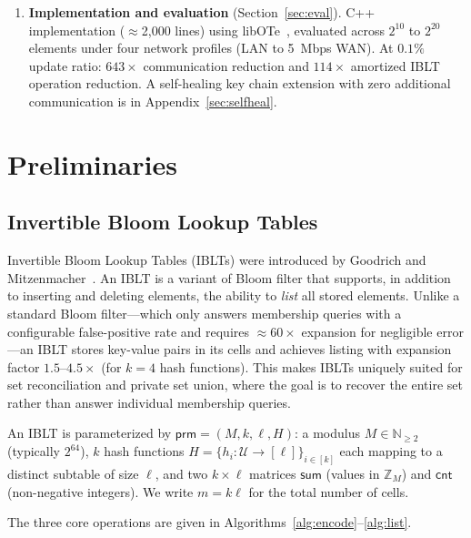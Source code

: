 \documentclass[letterpaper,twocolumn,10pt]{article}
\theoremstyle{definition}
\newcommand{\Z}{\mathbb{Z}}\newcommand{\N}{\mathbb{N}}
\newcommand{\U}{\mathcal{U}}\newcommand{\cF}{\mathcal{F}}
\newcommand{\prm}{\mathsf{prm}}\newcommand{\Enc}{\mathsf{Enc}}
\begin{document}
\begin{enumerate}
\item \textbf{Implementation and evaluation} (Section~\ref{sec:eval}). C++
implementation ($\approx$2,000 lines) using libOTe~\cite{libOTe}, evaluated
across $2^{10}$ to $2^{20}$ elements under four network profiles (LAN to
5~Mbps WAN). At $0.1\%$ update ratio: $643\times$ communication reduction and
$114\times$ amortized IBLT operation reduction. A self-healing key chain
extension with zero additional communication is in
Appendix~\ref{sec:selfheal}.
\end{enumerate}

\section{Preliminaries}
\label{sec:prelim}

\subsection{Invertible Bloom Lookup Tables}

Invertible Bloom Lookup Tables (IBLTs) were introduced by Goodrich and
Mitzenmacher~\cite{GM11}. An IBLT is a variant of Bloom filter that supports,
in addition to inserting and deleting elements, the ability to \emph{list} all
stored elements. Unlike a standard Bloom filter---which only answers membership
queries with a configurable false-positive rate and requires $\approx 60\times$
expansion for negligible error---an IBLT stores key-value pairs in its cells
and achieves listing with expansion factor $1.5$--$4.5\times$ (for $k = 4$ hash
functions). This makes IBLTs uniquely suited for set reconciliation and private
set union, where the goal is to recover the entire set rather than answer
individual membership queries.

An IBLT is parameterized by $\prm = (M, k, \ell, H)$: a modulus $M \in
\N_{\geq 2}$ (typically $2^{64}$), $k$ hash functions $H = \{h_i : \U \to
[\ell]\}_{i \in [k]}$ each mapping to a distinct subtable of size $\ell$, and
two $k \times \ell$ matrices $\mathsf{sum}$ (values in $\Z_M$) and
$\mathsf{cnt}$ (non-negative integers). We write $m = k\ell$ for the total
number of cells.

The three core operations are given in Algorithms~\ref{alg:encode}--\ref{alg:list}.
\end{document}
